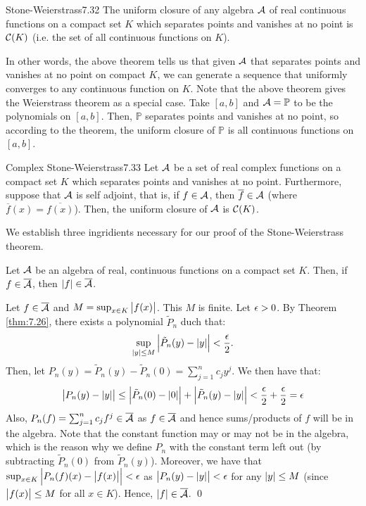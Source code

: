 \setcounter{rudin}{31}

\begin{theorem}{Stone-Weierstrass}{7.32}
    The uniform closure of any algebra $\mathcal{A}$ of real continuous functions on a compact set $K$ which separates points and vanishes at no point is $\mathcal{C}(K)$ (i.e. the set of all continuous functions on $K$).
\end{theorem}
\noindent In other words, the above theorem tells us that given $\mathcal{A}$ that separates points and vanishes at no point on compact $K$, we can generate a sequence that uniformly converges to any continuous function on $K$. Note that the above theorem gives the Weierstrass theorem as a special case. Take $[a, b]$ and $\mathcal{A} = \mathbb{P}$ to be the polynomials on $[a, b]$. Then, $\mathbb{P}$ separates points and vanishes at no point, so according to the theorem, the uniform closure of $\mathbb{P}$ is all continuous functions on $[a, b]$. 

\begin{theorem}{Complex Stone-Weierstrass}{7.33}
    Let $\mathcal{A}$ be a set of real complex functions on a compact set $K$ which separates points and vanishes at no point. Furthermore, suppose that $\mathcal{A}$ is self adjoint, that is, if $f \in \mathcal{A}$, then $\overline{f} \in \mathcal{A}$ (where $\overline{f}(x) = \overline{f(x)}$). Then, the uniform closure of $\mathcal{A}$ is $\mathcal{C}(K)$. 
\end{theorem}

\noindent We establish three ingridients necessary for our proof of the Stone-Weierstrass theorem.

\begin{nlemma}{ 1}
    Let $\mathcal{A}$ be an algebra of real, continuous functions on a compact set $K$. Then, if $f \in \overline{\mathcal{A}}$, then $\abs{f} \in \overline{\mathcal{A}}$. 
\end{nlemma}

\begin{nproof}
    Let $f \in \overline{\mathcal{A}}$ and $M = \sup_{x \in K}\abs{f(x)}$. This $M$ is finite. Let $\epsilon > 0$. By Theorem \ref{thm:7.26}, there exists a polynomial $\tilde{P}_n$ duch that:
    \begin{align*}
        \sup_{\abs{y} \leq M}\abs{\tilde{P}_n(y) - \abs{y}} < \frac{\epsilon}{2}.
    \end{align*}
    Then, let $P_n(y) = \tilde{P}_n(y) - \tilde{P}_n(0) = \sum_{j=1}^n c_jy^j$. We then have that:
    \begin{align*}
        \abs{P_n(y) - \abs{y}} \leq \abs{\tilde{P}_n(0) - \abs{0}} + \abs{\tilde{P}_n(y) - \abs{y}} < \frac{\epsilon}{2} + \frac{\epsilon}{2} = \epsilon
    \end{align*}
    Also, $P_n(f) = \sum_{j=1}^n c_jf^j \in \overline{\mathcal{A}}$ as $f \in \overline{\mathcal{A}}$ and hence sums/products of $f$ will be in the algebra. Note that the constant function may or may not be in the algebra, which is the reason why we define $P_n$ with the constant term left out (by subtracting $\tilde{P}_n(0)$ from $\tilde{P}_n(y)$). Moreover, we have that $\sup_{x \in K}\abs{P_n(f)(x) - \abs{f(x)}} < \epsilon$ as $\abs{P_n(y) - \abs{y}} < \epsilon$ for any $\abs{y} \leq M$ (since $\abs{f(x)} \leq M$ for all $x \in K$). Hence, $\abs{f} \in \overline{\mathcal{A}}$. \qed
\end{nproof}

